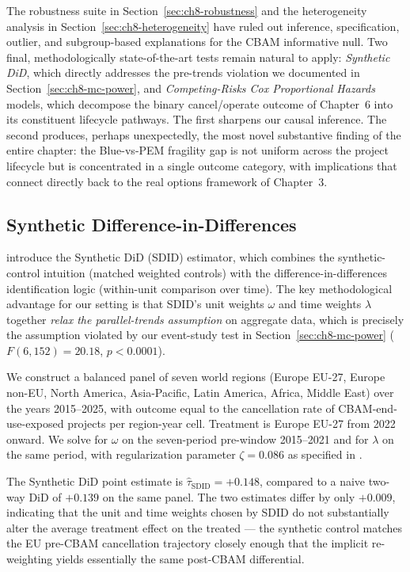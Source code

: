 \documentclass[11pt,a4paper]{article}
\begin{document}
The robustness suite in Section~\ref{sec:ch8-robustness} and the heterogeneity analysis in Section~\ref{sec:ch8-heterogeneity} have ruled out inference, specification, outlier, and subgroup-based explanations for the CBAM informative null. Two final, methodologically state-of-the-art tests remain natural to apply: \emph{Synthetic DiD}, which directly addresses the pre-trends violation we documented in Section~\ref{sec:ch8-mc-power}, and \emph{Competing-Risks Cox Proportional Hazards} models, which decompose the binary cancel/operate outcome of Chapter~6 into its constituent lifecycle pathways. The first sharpens our causal inference. The second produces, perhaps unexpectedly, the most novel substantive finding of the entire chapter: the Blue-vs-PEM fragility gap is not uniform across the project lifecycle but is concentrated in a single outcome category, with implications that connect directly back to the real options framework of Chapter~3.

\subsection{Synthetic Difference-in-Differences}

\citet{arkhangelsky2021synthetic} introduce the Synthetic DiD (SDID) estimator, which combines the synthetic-control intuition (matched weighted controls) with the difference-in-differences identification logic (within-unit comparison over time). The key methodological advantage for our setting is that SDID's unit weights $\omega$ and time weights $\lambda$ together \emph{relax the parallel-trends assumption} on aggregate data, which is precisely the assumption violated by our event-study test in Section~\ref{sec:ch8-mc-power} ($F(6,152) = 20.18$, $p < 0.0001$).

We construct a balanced panel of seven world regions (Europe EU-27, Europe non-EU, North America, Asia-Pacific, Latin America, Africa, Middle East) over the years 2015--2025, with outcome equal to the cancellation rate of CBAM-end-use-exposed projects per region-year cell. Treatment is Europe EU-27 from 2022 onward. We solve for $\omega$ on the seven-period pre-window 2015--2021 and for $\lambda$ on the same period, with regularization parameter $\zeta = 0.086$ as specified in \citet[Eq.~3.7]{arkhangelsky2021synthetic}.

The Synthetic DiD point estimate is $\hat\tau_{\mathrm{SDID}} = +0.148$, compared to a naive two-way DiD of $+0.139$ on the same panel. The two estimates differ by only $+0.009$, indicating that the unit and time weights chosen by SDID do not substantially alter the average treatment effect on the treated --- the synthetic control matches the EU pre-CBAM cancellation trajectory closely enough that the implicit re-weighting yields essentially the same post-CBAM differential.
\end{document}
